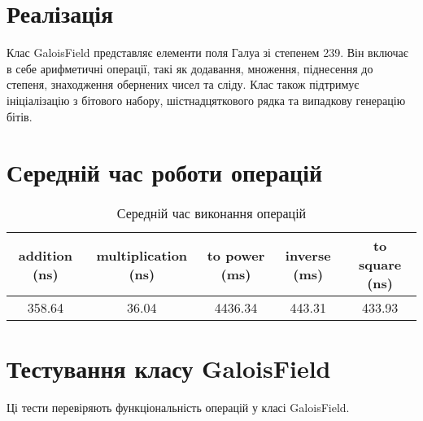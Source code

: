\documentclass{article}
\begin{document}
\newpage
\section{Реалізація}
\quad Клас GaloisField представляє елементи поля Галуа зі степенем 239. Він включає в себе арифметичні операції, такі як додавання, множення, піднесення до степеня, знаходження обернених чисел та сліду. Клас також підтримує ініціалізацію з бітового набору, шістнадцяткового рядка та випадкову генерацію бітів.

\section{Середній час роботи операцій}
\quad
\begin{table}[h]
\centering
\begin{tabular}{|c|c|c|c|c|}
\hline
\textbf{addition (ns)} & \textbf{multiplication (ns)} & \textbf{to power (ms)} & \textbf{inverse (ms)} & \textbf{to square (ns)}\\
\hline
358.64 & 36.04 & 4436.34 & 443.31 & 433.93\\
\hline
\end{tabular}
\caption{Середній час виконання операцій}
\label{tab:comparison}
\end{table}

\section{Тестування класу GaloisField}

Ці тести перевіряють функціональність операцій у класі GaloisField.
\end{document}
